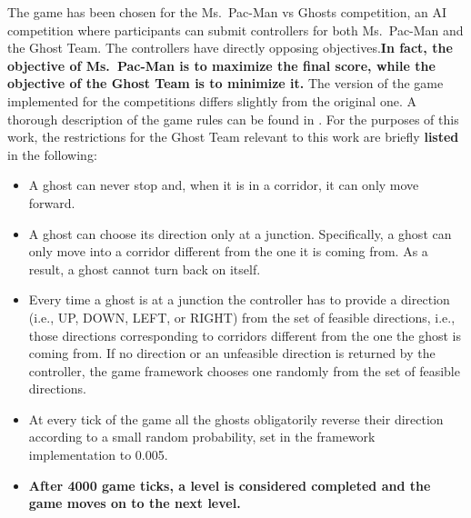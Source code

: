 \documentclass[journal]{IEEEtran}
\begin{document}
The game has been chosen for the Ms.\  Pac-Man vs Ghosts competition, an AI competition where participants can submit controllers for both Ms.\  Pac-Man and the Ghost Team. The controllers have directly opposing objectives.\textbf{In fact, the objective of Ms.\  Pac-Man is to maximize the final score, while the objective of the Ghost Team is to minimize it.} The version of the game implemented for the competitions differs slightly from the original one. A thorough description of the game rules can be found in \cite{MsPacManVSGhost2011}. For the purposes of this work, the restrictions for the Ghost Team relevant to this work are briefly \textbf{listed} in the following:
\begin{itemize}
  \item A ghost can never stop and, when it is in a corridor, it can only move forward.
  \item A ghost can choose its direction only at a junction. Specifically, a ghost can only move into a corridor different from the one it is coming from. As a result, a ghost cannot turn back on itself.
  \item Every time a ghost is at a junction the controller has to provide a direction (i.e., UP, DOWN, LEFT, or RIGHT) from the set of feasible directions, i.e., those directions corresponding to corridors different from the one the ghost is coming from. If no direction or an unfeasible direction is returned by the controller, the game framework chooses one randomly from the set of feasible directions.
  \item At every tick of the game all the ghosts obligatorily reverse their direction according to a small random probability, set in the framework implementation to 0.005.
  \item \textbf{After 4000 game ticks, a level is considered completed and the game moves on to the next level.}
\end{itemize}
\end{document}
